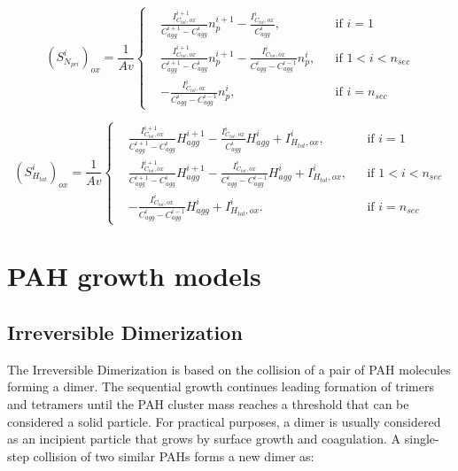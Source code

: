 \begin{equation}
	\left(S^i_{N_{pri}}\right)_{ox}=
	\frac{1}{Av}
	\left\{
	\begin{aligned}
		&\frac{I^{i+1}_{C_{tot},ox}}{C^{i+1}_{agg}-C^{i}_{agg}}n^{i+1}_p
		-
		\frac{I^{i}_{C_{tot},ox}}{C^{i}_{agg}},
		&&
		\text{if } i = 1
		\\
		&\frac{I^{i+1}_{C_{tot},ox}}{C^{i+1}_{agg}-C^{i}_{agg}}n^{i+1}_p
		-
		\frac{I^{i}_{C_{tot},ox}}{C^{i}_{agg}-C^{i-1}_{agg}}n^{i}_p,
		&&
		\text{if } 1 < i < n_{sec}
		\\
		&
		-
		\frac{I^{i}_{C_{tot},ox}}{C^{i}_{agg}-C^{i-1}_{agg}}n^{i}_p,
		&&\text{if } i=n_{sec}
	\end{aligned}
	\right.
	\label{eqn:S_Npri_oxsect}
\end{equation}

\begin{equation}
	\left(S^i_{H_{tot}}\right)_{ox}=
	\frac{1}{Av}
	\left\{
	\begin{aligned}
		&\frac{I^{i+1}_{C_{tot},ox}}{C^{i+1}_{agg}-C^{i}_{agg}}H^{i+1}_{agg}
		-
		\frac{I^{i}_{C_{tot},ox}}{C^{i}_{agg}}H^{i}_{agg}
		+ I^{i}_{H_{tot}, ox},
		&&
		\text{if } i = 1
		\\
		&\frac{I^{i+1}_{C_{tot},ox}}{C^{i+1}_{agg}-C^{i}_{agg}}H^{i+1}_{agg}
		-
		\frac{I^{i}_{C_{tot},ox}}{C^{i}_{agg}-C^{i-1}_{agg}}H^{i}_{agg}
		+ I^{i}_{H_{tot}, ox},
		&&
		\text{if } 1 < i < n_{sec}
		\\
		&
		-
		\frac{I^{i}_{C_{tot},ox}}{C^{i}_{agg}-C^{i-1}_{agg}}H^{i}_{agg}
		+ I^{i}_{H_{tot}, ox}.
		&&\text{if } i=n_{sec}
	\end{aligned}
	\right.
	\label{eqn:S_Htot_oxsect}
\end{equation}



\section{PAH growth models}

\subsection{Irreversible Dimerization}
\label{sec:irrevdim}

The Irreversible Dimerization is based on the collision of a pair of PAH molecules forming a dimer. The sequential growth continues leading formation of trimers and tetramers until the PAH cluster mass reaches a threshold that can be considered a solid particle. For practical purposes, a dimer is usually considered as an incipient particle that grows by surface growth and coagulation. A single-step collision of two similar PAHs forms a new dimer as:

